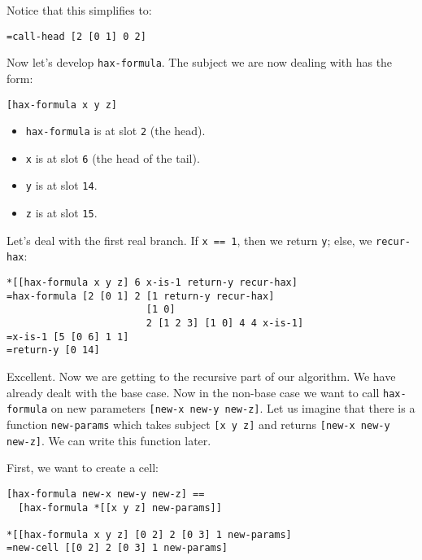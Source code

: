 \documentclass[twoside]{article}
\begin{document}
\noindent
Notice that this simplifies to:

\begin{lstlisting}[style=listingblock]
=call-head [2 [0 1] 0 2]
\end{lstlisting}

Now let's develop \lstinline[style=inlinecode]{hax-formula}. The subject we are now dealing with has the form:

\begin{lstlisting}[style=listingblock]
[hax-formula x y z]
\end{lstlisting}

\begin{itemize}
  \item \lstinline[style=inlinecode]{hax-formula} is at slot \lstinline[style=inlinecode]{2} (the head).
  \item \lstinline[style=inlinecode]{x} is at slot \lstinline[style=inlinecode]{6} (the head of the tail).
  \item \lstinline[style=inlinecode]{y} is at slot \lstinline[style=inlinecode]{14}.
  \item \lstinline[style=inlinecode]{z} is at slot \lstinline[style=inlinecode]{15}.
\end{itemize}

\noindent
Let's deal with the first real branch.  If \lstinline[style=inlinecode]{x == 1}, then we return \lstinline[style=inlinecode]{y}; else, we \lstinline[style=inlinecode]{recur-hax}:

\begin{lstlisting}[style=listingblock]
*[[hax-formula x y z] 6 x-is-1 return-y recur-hax]
=hax-formula [2 [0 1] 2 [1 return-y recur-hax]
                        [1 0]
                        2 [1 2 3] [1 0] 4 4 x-is-1]
=x-is-1 [5 [0 6] 1 1]
=return-y [0 14]
\end{lstlisting}

\noindent
Excellent. Now we are getting to the recursive part of our algorithm. We have already dealt with the base case. Now in the non-base case we want to call \lstinline[style=inlinecode]{hax-formula} on new parameters \lstinline[style=inlinecode]{[new-x new-y new-z]}. Let us imagine that there is a function \lstinline[style=inlinecode]{new-params} which takes subject \lstinline[style=inlinecode]{[x y z]} and returns \lstinline[style=inlinecode]{[new-x new-y new-z]}.  We can write this function later.

First, we want to create a cell:

\begin{lstlisting}[style=listingblock]
[hax-formula new-x new-y new-z] ==
  [hax-formula *[[x y z] new-params]]

*[[hax-formula x y z] [0 2] 2 [0 3] 1 new-params]
=new-cell [[0 2] 2 [0 3] 1 new-params]
\end{lstlisting}
\end{document}
